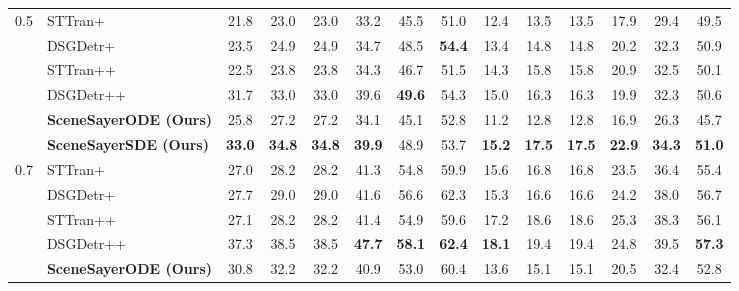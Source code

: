 \begin{table}[!h]
{\begin{tabular}{ll|cccccc|cccccc}
          \cmidrule(lr){2-7} \cmidrule(lr){8-13} 
        \multirow{6}{*}{0.5} &        STTran+ \cite{cong_et_al_sttran_2021} & 21.8 & 23.0 & 23.0 & 33.2 & 45.5 & 51.0 & 12.4 & 13.5 & 13.5 & 17.9 & 29.4 & 49.5  \\ 
        &        DSGDetr+ \cite{Feng_2021} & 23.5 & 24.9 & 24.9 & 34.7 & 48.5 & \cellcolor{highlightColor} \textbf{54.4} & 13.4 & 14.8 & 14.8 & 20.2 & 32.3 & 50.9  \\ 
        &        STTran++ \cite{cong_et_al_sttran_2021} & 22.5 & 23.8 & 23.8 & 34.3 & 46.7 & 51.5 & 14.3 & 15.8 & 15.8 & 20.9 & 32.5 & 50.1  \\ 
        &        DSGDetr++ \cite{Feng_2021} & 31.7 & 33.0 & 33.0 & 39.6 & \cellcolor{highlightColor} \textbf{49.6} & 54.3 & 15.0 & 16.3 & 16.3 & 19.9 & 32.3 & 50.6  \\ 
        &        \textbf{SceneSayerODE (Ours)} & 25.8 & 27.2 & 27.2 & 34.1 & 45.1 & 52.8 & 11.2 & 12.8 & 12.8 & 16.9 & 26.3 & 45.7  \\ 
        &        \textbf{SceneSayerSDE (Ours)} & \cellcolor{highlightColor} \textbf{33.0} & \cellcolor{highlightColor} \textbf{34.8} & \cellcolor{highlightColor} \textbf{34.8} & \cellcolor{highlightColor} \textbf{39.9} & 48.9 & 53.7 & \cellcolor{highlightColor} \textbf{15.2} & \cellcolor{highlightColor} \textbf{17.5} & \cellcolor{highlightColor} \textbf{17.5} & \cellcolor{highlightColor} \textbf{22.9} & \cellcolor{highlightColor} \textbf{34.3} & \cellcolor{highlightColor} \textbf{51.0}  \\ 
          \cmidrule(lr){2-7} \cmidrule(lr){8-13} 
        \multirow{6}{*}{0.7} &        STTran+ \cite{cong_et_al_sttran_2021} & 27.0 & 28.2 & 28.2 & 41.3 & 54.8 & 59.9 & 15.6 & 16.8 & 16.8 & 23.5 & 36.4 & 55.4  \\ 
        &        DSGDetr+ \cite{Feng_2021} & 27.7 & 29.0 & 29.0 & 41.6 & 56.6 & 62.3 & 15.3 & 16.6 & 16.6 & 24.2 & 38.0 & 56.7  \\ 
        &        STTran++ \cite{cong_et_al_sttran_2021} & 27.1 & 28.2 & 28.2 & 41.4 & 54.9 & 59.6 & 17.2 & 18.6 & 18.6 & 25.3 & 38.3 & 56.1  \\ 
        &        DSGDetr++ \cite{Feng_2021} & 37.3 & 38.5 & 38.5 & \cellcolor{highlightColor} \textbf{47.7} & \cellcolor{highlightColor} \textbf{58.1} & \cellcolor{highlightColor} \textbf{62.4} & \cellcolor{highlightColor} \textbf{18.1} & 19.4 & 19.4 & 24.8 & 39.5 & \cellcolor{highlightColor} \textbf{57.3}  \\ 
        &        \textbf{SceneSayerODE (Ours)} & 30.8 & 32.2 & 32.2 & 40.9 & 53.0 & 60.4 & 13.6 & 15.1 & 15.1 & 20.5 & 32.4 & 52.8  \\ 

\end{tabular}}
\end{table}
